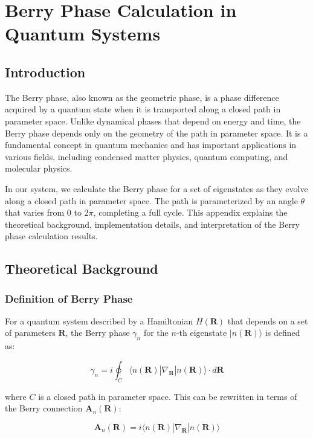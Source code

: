 \section{Berry Phase Calculation in Quantum Systems}
\label{appendix:berry_phase}

\subsection{Introduction}

The Berry phase, also known as the geometric phase, is a phase difference acquired by a quantum state when it is transported along a closed path in parameter space. Unlike dynamical phases that depend on energy and time, the Berry phase depends only on the geometry of the path in parameter space. It is a fundamental concept in quantum mechanics and has important applications in various fields, including condensed matter physics, quantum computing, and molecular physics.

In our system, we calculate the Berry phase for a set of eigenstates as they evolve along a closed path in parameter space. The path is parameterized by an angle $\theta$ that varies from 0 to $2\pi$, completing a full cycle. This appendix explains the theoretical background, implementation details, and interpretation of the Berry phase calculation results.

\subsection{Theoretical Background}

\subsubsection{Definition of Berry Phase}

For a quantum system described by a Hamiltonian $H(\mathbf{R})$ that depends on a set of parameters $\mathbf{R}$, the Berry phase $\gamma_n$ for the $n$-th eigenstate $|n(\mathbf{R})\rangle$ is defined as:

\begin{equation}
\gamma_n = i \oint_C \langle n(\mathbf{R})|\nabla_\mathbf{R}|n(\mathbf{R})\rangle \cdot d\mathbf{R}
\end{equation}

where $C$ is a closed path in parameter space. This can be rewritten in terms of the Berry connection $\mathbf{A}_n(\mathbf{R})$:

\begin{equation}
\mathbf{A}_n(\mathbf{R}) = i\langle n(\mathbf{R})|\nabla_\mathbf{R}|n(\mathbf{R})\rangle
\end{equation}

